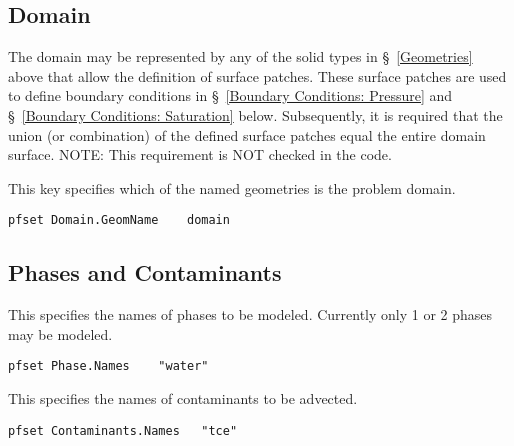 
\subsection{Domain}
\label{Domain}

The domain may be represented by any of the solid types in
\S~\ref{Geometries} above that allow the definition of surface patches.
These surface patches are used to define boundary conditions in
\S~\ref{Boundary Conditions: Pressure} and
\S~\ref{Boundary Conditions: Saturation} below.
Subsequently, it is required that the union (or combination) of the defined surface
patches equal the entire domain surface.  NOTE: This requirement is NOT checked
in the code.

{
This key specifies which of the named geometries is the problem domain.
}
\begin{display}\begin{verbatim}
pfset Domain.GeomName    domain
\end{verbatim}\end{display}


\subsection{Phases and Contaminants}
\label{Phases and Contaminants}

{This specifies the names of phases to be modeled.
Currently only 1 or 2 phases may be modeled.}
\begin{display}\begin{verbatim}
pfset Phase.Names    "water"
\end{verbatim}\end{display}

{This specifies the names of contaminants to be advected.}
\begin{display}\begin{verbatim}
pfset Contaminants.Names   "tce"
\end{verbatim}\end{display}

